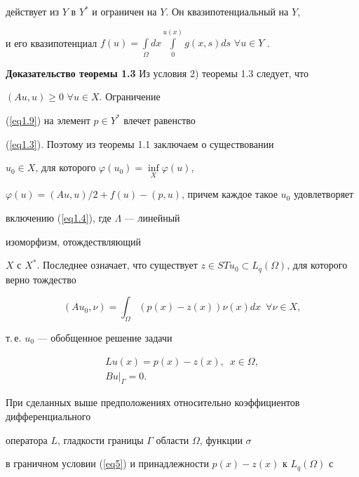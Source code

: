 действует из $Y$ в $Y^*$ и ограничен на $Y$. Он квазипотенциальный на $Y$,


и его квазипотенциал $f(u)= \int\limits_\Omega dx \int\limits_0^{u(x)}g(x,s)


ds$ $\forall u \in Y$ \cite{n23}.


\medskip





{\bf Доказательство теоремы 1.3} Из условия 2) теоремы 1.3 следует, что


$(Au,u) \ge 0$ $\forall u \in X$. Ограничение


(\ref{eq1.9}) на элемент $p \in Y^*$ влечет равенство


(\ref{eq1.3}). Поэтому из теоремы 1.1 заключаем о существовании


$u_0 \in X$, для которого $\varphi(u_0)=\inf\limits_X \varphi(u)$,


$\varphi(u)=(Au,u)/2+f(u)-(p,u)$, причем каждое такое $u_0$ удовлетворяет


включению (\ref{eq1.4}), где $\Lambda$ --- линейный


изоморфизм, отождествляющий


$X$ с $X^*$. Последнее означает, что существует $z \in S Tu_0 \subset


L_q(\Omega)$, для которого верно тождество


$$


(Au_0,\nu)=\int_\Omega (p(x)-z(x))\nu(x) dx \ \; \forall \nu \in X,


$$


т.\,е. $u_0$ --- обобщенное решение задачи


\begin{gather}


Lu(x) = p(x)-z(x), \ \; x\in\Omega, \label{eq3.1} \\


%


Bu |_\Gamma=0. \label{eq3.2}


\end{gather}





При сделанных выше предположениях относительно коэффициентов дифференциального


оператора $L$, гладкости границы $\Gamma$ области $\Omega$, функции $\sigma$


в граничном условии (\ref{eq5}) и принадлежности $p(x)-z(x)$ к $L_q(\Omega)$ с



